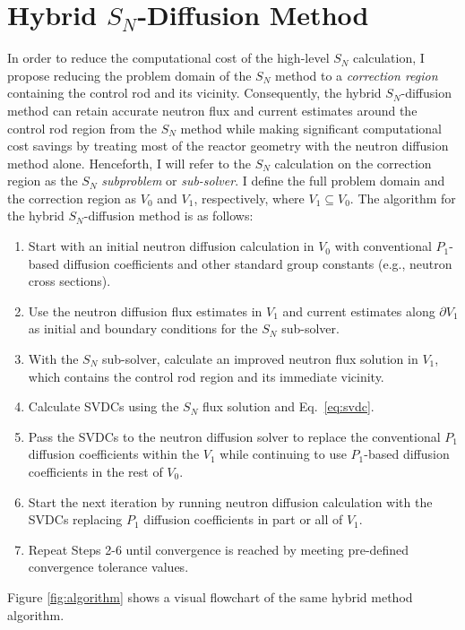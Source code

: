 \section{Hybrid $S_N$-Diffusion Method} \label{sec:hybrid-method}

In order to reduce the computational cost of the high-level $S_N$ calculation, I propose reducing
the problem domain of the $S_N$ method to a \textit{correction region} containing the control rod
and its vicinity. Consequently, the hybrid $S_N$-diffusion method can retain accurate neutron flux
and current estimates around the control rod region from the $S_N$ method while making significant
computational cost savings by treating most of the reactor geometry with the neutron diffusion
method alone. Henceforth, I will refer to the $S_N$ calculation on the correction
region as the $S_N$ \textit{subproblem} or \textit{sub-solver}. I define the full problem
domain and the correction region as $V_0$ and $V_1$, respectively, where
$V_1\subseteq V_0$. The algorithm for the hybrid $S_N$-diffusion method is as follows:
%
\begin{enumerate}
  \item Start with an initial neutron diffusion calculation in $V_0$ with conventional
    $P_1$-based diffusion coefficients and other standard group constants (e.g., neutron cross
    sections).
  \item Use the neutron diffusion flux estimates in $V_1$ and current estimates along
    $\partial V_1$ as initial and boundary conditions for the $S_N$ sub-solver.
  \item With the $S_N$ sub-solver, calculate an improved neutron flux solution in $V_1$,
    which contains the control rod region and its immediate vicinity.
  \item Calculate \glspl{SVDC} using the $S_N$ flux solution and Eq.\ \ref{eq:svdc}.
  \item Pass the \glspl{SVDC} to the neutron diffusion solver to replace the conventional
    $P_1$ diffusion coefficients within the $V_1$ while continuing to use $P_1$-based
    diffusion coefficients in the rest of $V_0$.
  \item Start the next iteration by running neutron diffusion calculation with the \glspl{SVDC}
    replacing $P_1$ diffusion coefficients in part or all of $V_1$.
  \item Repeat Steps 2-6 until convergence is reached by meeting pre-defined convergence tolerance
    values.
\end{enumerate}
%
Figure \ref{fig:algorithm} shows a visual flowchart of the same hybrid method algorithm.


